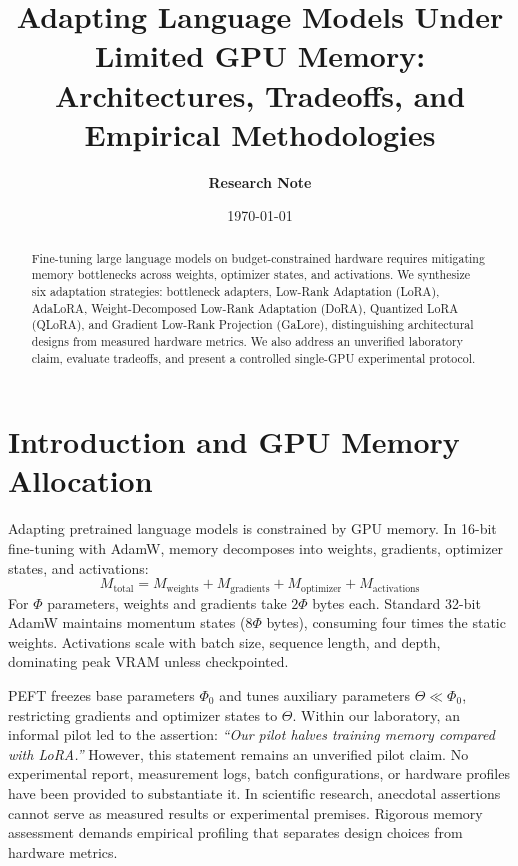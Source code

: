 \documentclass[11pt,a4paper]{article}
\title{\textbf{Adapting Language Models Under Limited GPU Memory:\\Architectures, Tradeoffs, and Empirical Methodologies}}
\author{\textbf{Research Note}}
\date{\today}
\begin{document}
\maketitle

\begin{abstract}
Fine-tuning large language models on budget-constrained hardware requires mitigating memory bottlenecks across weights, optimizer states, and activations. We synthesize six adaptation strategies: bottleneck adapters, Low-Rank Adaptation (LoRA), AdaLoRA, Weight-Decomposed Low-Rank Adaptation (DoRA), Quantized LoRA (QLoRA), and Gradient Low-Rank Projection (GaLore), distinguishing architectural designs from measured hardware metrics. We also address an unverified laboratory claim, evaluate tradeoffs, and present a controlled single-GPU experimental protocol.
\end{abstract}

\section{Introduction and GPU Memory Allocation}

Adapting pretrained language models is constrained by GPU memory. In 16-bit fine-tuning with AdamW, memory decomposes into weights, gradients, optimizer states, and activations:
\begin{equation}
M_{\text{total}} = M_{\text{weights}} + M_{\text{gradients}} + M_{\text{optimizer}} + M_{\text{activations}}
\end{equation}
For $\Phi$ parameters, weights and gradients take $2\Phi$ bytes each. Standard 32-bit AdamW maintains momentum states ($8\Phi$ bytes), consuming four times the static weights. Activations scale with batch size, sequence length, and depth, dominating peak VRAM unless checkpointed.

PEFT freezes base parameters $\Phi_0$ and tunes auxiliary parameters $\Theta \ll \Phi_0$, restricting gradients and optimizer states to $\Theta$. Within our laboratory, an informal pilot led to the assertion: \textit{``Our pilot halves training memory compared with LoRA.''} However, this statement remains an unverified pilot claim. No experimental report, measurement logs, batch configurations, or hardware profiles have been provided to substantiate it. In scientific research, anecdotal assertions cannot serve as measured results or experimental premises. Rigorous memory assessment demands empirical profiling that separates design choices from hardware metrics.
\end{document}
